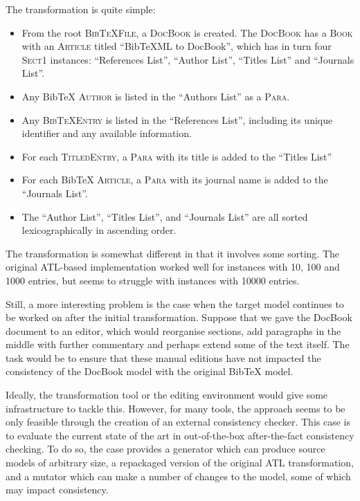 \documentclass[a4paper]{scrartcl}
\newcommand*{\class}[1]{\textsc{#1}}
\begin{document}
The transformation is quite simple:

\begin{itemize}
\item From the root \class{BibTeXFile}, a \class{DocBook} is created. The
  \class{DocBook} has a \class{Book} with an \class{Article} titled ``BibTeXML
  to DocBook'', which has in turn four \class{Sect1} instances: ``References
  List'', ``Author List'', ``Titles List'' and ``Journals List''.

\item Any BibTeX \class{Author} is listed in the ``Authors List'' as a \class{Para}.

\item Any \class{BibTeX\-Entry} is listed in the ``References List'', including
  its unique identifier and any available information.

\item For each \class{Titled\-Entry}, a \class{Para} with its title is added to
  the ``Titles List''

\item For each BibTeX \class{Article}, a \class{Para} with its journal name is
  added to the ``Journals List''.

\item The ``Author List'', ``Titles List'', and ``Journals List'' are all sorted
  lexicographically in ascending order.
\end{itemize}

The transformation is somewhat different in that it involves some sorting. The
original ATL-based implementation worked well for instances with 10, 100 and
1000 entries, but seems to struggle with instances with 10000 entries.

Still, a more interesting problem is the case when the target model continues to
be worked on after the initial transformation. Suppose that we gave the DocBook
document to an editor, which would reorganise sections, add paragraphs in the
middle with further commentary and perhaps extend some of the text itself. The
task would be to ensure that these manual editions have not impacted the
consistency of the DocBook model with the original BibTeX model.

Ideally, the transformation tool or the editing environment would give some
infrastructure to tackle this. However, for many tools, the approach seems to be
only feasible through the creation of an external consistency checker. This case
is to evaluate the current state of the art in out-of-the-box after-the-fact
consistency checking. To do so, the case provides a generator which can produce
source models of arbitrary size, a repackaged version of the original ATL
transformation, and a mutator which can make a number of changes to the model,
some of which may impact consistency.
\end{document}
